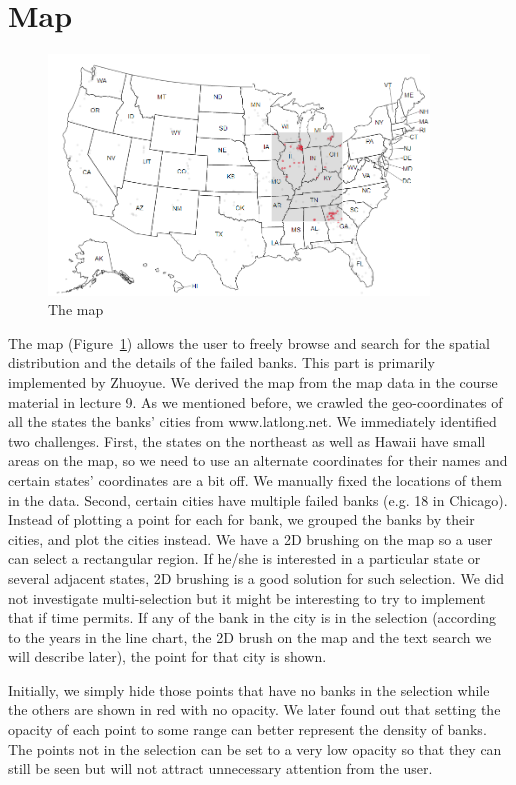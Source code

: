\section{Map}

\begin{figure}[!h]
    \centering
    \includegraphics[width=0.9\textwidth]{fig/map}
    \caption{The map}
    \label{fig:map}
\end{figure}

The map (Figure~\ref{fig:map}) allows the user to freely browse and search for
the spatial distribution and the details of the failed banks. This part is
primarily implemented by Zhuoyue. We derived the map from the map data in the
course material in lecture 9. As we mentioned before, we crawled the
geo-coordinates of all the states the banks' cities from www.latlong.net. We
immediately identified two challenges. First, the states on the northeast as
well as Hawaii have small areas on the map, so we need to use an alternate
coordinates for their names and certain states' coordinates are a bit off. We
manually fixed the locations of them in the data. Second, certain cities have
multiple failed banks (e.g. 18 in Chicago). Instead of plotting a point for
each for bank, we grouped the banks by their cities, and plot the cities
instead. We have a 2D brushing on the map so a user can select a rectangular
region. If he/she is interested in a particular state or several adjacent
states, 2D brushing is a good solution for such selection. We did not
investigate multi-selection but it might be interesting to try to implement
that if time permits. If any of the bank in the city is in the selection
(according to the years in the line chart, the 2D brush on the map and the
text search we will describe later), the point for that city is shown.

Initially, we simply hide those points that have no banks in the selection
while the others are shown in red with no opacity. We later found out that
setting the opacity of each point to some range can better represent the
density of banks. The points not in the selection can be set to a very low
opacity so that they can still be seen but will not attract unnecessary
attention from the user.

